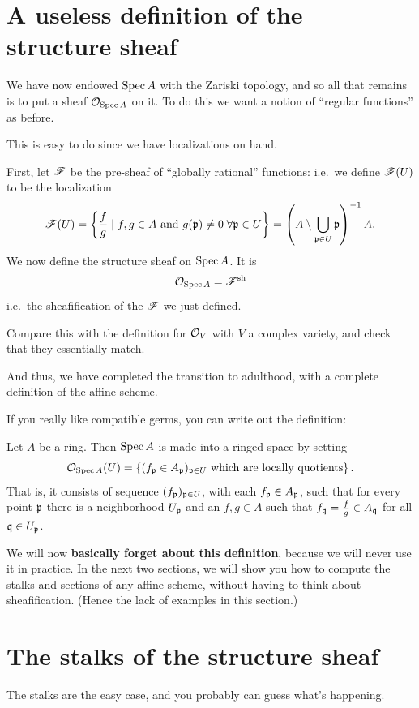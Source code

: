 \section{A useless definition of the structure sheaf}

We have now endowed $\operatorname{Spec} A$ with the Zariski topology,
and so all that remains is to put a sheaf $\mathcal O_{\operatorname{Spec} A}$ on it.
To do this we want a notion of ``regular functions'' as before.

This is easy to do since we have localizations on hand.
\begin{definition}
	First, let $\mathscr F$ be the pre-sheaf of ``globally rational'' functions:
	i.e.\ we define $\mathscr F(U)$ to be the localization
	\[
		\mathscr F(U) = \left\{
			\frac fg \mid f, g \in A
			\text{ and } g(\mathfrak p) \neq 0 \; \forall \mathfrak p \in U
		\right\}
		= \left(A \setminus \bigcup_{\mathfrak p \in U} \mathfrak p \right)^{-1} A.
	\]
	We now define the structure sheaf on $\operatorname{Spec} A$.
	It is
	\[ \mathcal O_{\operatorname{Spec} A} = \mathscr F^\mathrm{sh} \]
	i.e.\ the sheafification of the $\mathscr F$ we just defined.
\end{definition}
\begin{exercise}
	Compare this with the definition for $\mathcal O_V$
	with $V$ a complex variety, and check that they essentially match.
\end{exercise}
And thus, we have completed the transition to adulthood,
with a complete definition of the affine scheme.

If you really like compatible germs,
you can write out the definition:
\begin{definition}
	Let $A$ be a ring.
	Then $\operatorname{Spec} A$ is made into a ringed space by setting
	\[ \mathcal O_{\operatorname{Spec} A}(U)
		= \left\{ (f_\mathfrak p \in A_\mathfrak p)_{\mathfrak p \in U}
		\text{ which are locally quotients} \right\}. \]
	That is, it consists of sequence $(f_\mathfrak p)_{\mathfrak p \in U}$, with
	each $f_\mathfrak p \in A_\mathfrak p$, such that for every point $\mathfrak p$ there
	is a neighborhood $U_\mathfrak p$ and an $f,g \in A$ such that
	$f_\mathfrak q = \frac fg \in A_\mathfrak q$ for all $\mathfrak q \in U_\mathfrak p$.
\end{definition}

We will now \textbf{basically forget about this definition},
because we will never use it in practice.
In the next two sections, we will show you how to compute
the stalks and sections of any affine scheme, without having
to think about sheafification.
(Hence the lack of examples in this section.)

\section{The stalks of the structure sheaf}
The stalks are the easy case,
and you probably can guess what's happening.

